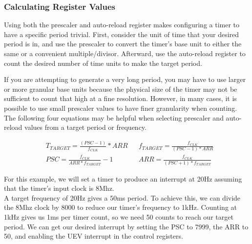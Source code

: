 \documentclass[11pt,fleqn]{book} %
\begin{document}
    \subsubsection{Calculating Register Values}
        Using both the prescaler and auto-reload register makes configuring a timer to have a specific period trivial. First, consider the unit of time that your desired period is in, and use the prescaler to convert the timer's base unit to either the same or a convenient multiple/divisor. Afterward, use the auto-reload register to count the desired number of time units to make the target period. 
        
        If you are attempting to generate a very long period, you may have to use larger or more granular base units because the physical size of the timer may not be sufficient to count that high at a fine resolution. However, in many cases, it is possible to use small prescaler values to have finer granularity when counting.
        The following four equations may be helpful when selecting prescaler and auto-reload values from a target period or frequency. 
        
        \begin{align*}
            & T_{TARGET} = \frac{(PSC-1)}{f_{CLK}} * ARR & & f_{TARGET} = \frac{f_{CLK}}{(PSC-1) * ARR}\\[1em]
            & PSC = \frac{f_{CLK}}{ARR * f_{TARGET}}-1 & & ARR = \frac{f_{CLK}}{(PSC+1) * f_{TARGET}}
        \end{align*}
        	
            
        \begin{center}
            \begin{example} 
            For this example, we will set a timer to produce an interrupt at 20Hz assuming that the timer's input clock is 8Mhz. \\
            
            A target frequency of 20Hz gives a 50ms period. To achieve this, we can divide the 8Mhz clock by 8000 to reduce our timer's frequency to 1kHz. Counting at 1kHz gives us 1ms per timer count, so we need 50 counts to reach our target period. We can get our desired interrupt by setting the PSC to 7999, the ARR to 50, and enabling the UEV interrupt in the control registers.  
            \end{example}
        \end{center}
        
\end{document}
